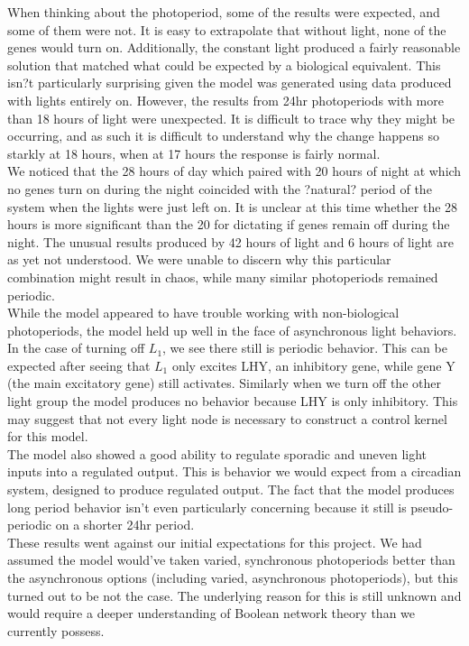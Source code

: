 \documentclass[twoside,twocolumn,9pt]{article}
\begin{document}
When thinking about the photoperiod, some of the results were expected, and some of them were not. It is easy to extrapolate that without light, none of the genes would turn on. Additionally, the constant light produced a fairly reasonable solution that matched what could be expected by a biological equivalent. This isn?t particularly surprising given the model was generated using data produced with lights entirely on. However, the results from 24hr photoperiods with more than 18 hours of light were unexpected. It is difficult to trace why they might be occurring, and as such it is difficult to understand why the change happens so starkly at 18 hours, when at 17 hours the response is fairly normal. \\
We noticed that the 28 hours of day which paired with 20 hours of night at which no genes turn on during the night coincided with the ?natural? period of the system when the lights were just left on. It is unclear at this time whether the 28 hours is more significant than the 20 for dictating if genes remain off during the night. The unusual results produced by 42 hours of light and 6 hours of light are as yet not understood. We were unable to discern why this particular combination might result in chaos, while many similar photoperiods remained periodic.\\
While the model appeared to have trouble working with non-biological photoperiods, the model held up well in the face of asynchronous light behaviors. In the case of turning off $L_1$, we see there still is periodic behavior. This can be expected after seeing that $L_1$ only excites LHY, an inhibitory gene, while gene Y (the main excitatory gene) still activates. Similarly when we turn off the other light group the model produces no behavior because LHY is only inhibitory. This may suggest that not every light node is necessary to construct a control kernel\cite{control} for this model.\\
The model also showed a good ability to regulate sporadic and uneven light inputs into a regulated output. This is behavior we would expect from a circadian system, designed to produce regulated output. The fact that the model produces long period behavior isn't even particularly concerning because it still is pseudo-periodic on a shorter 24hr period. \\
These results went against our initial expectations for this project. We had assumed the model would've taken varied, synchronous photoperiods better than the asynchronous options (including varied, asynchronous photoperiods), but this turned out to be not the case. The underlying reason for this is still unknown and would require a deeper understanding of Boolean network theory than we currently possess.
\end{document}
